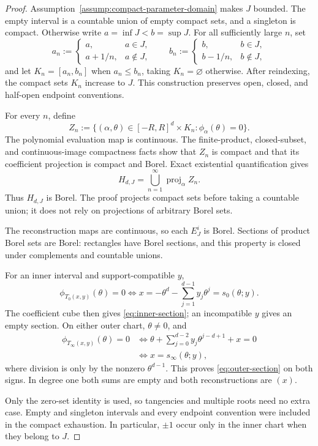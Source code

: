 \begin{proof}
Assumption~\ref{assump:compact-parameter-domain} makes $J$ bounded.  The
empty interval is a countable union of empty compact sets, and a singleton is
compact.  Otherwise write $a=\inf J<b=\sup J$.  For all sufficiently large
$n$, set
\[
a_n:=\begin{cases}a,&a\in J,\\a+1/n,&a\notin J,\end{cases}
\qquad
b_n:=\begin{cases}b,&b\in J,\\b-1/n,&b\notin J,\end{cases}
\]
and let $K_n=[a_n,b_n]$ when $a_n\leq b_n$, taking $K_n=\varnothing$
otherwise.  After reindexing, the compact sets $K_n$ increase to $J$.  This
construction preserves open, closed, and half-open endpoint conventions.

For every $n$, define
\[
Z_n:=\{(\alpha,\theta)\in[-R,R]^d\times K_n:
\phi_\alpha(\theta)=0\}.
\]
The polynomial evaluation map is continuous.  The finite-product,
closed-subset, and continuous-image compactness facts
\citep[Sections~24 and~26]{Munkres2000} show that $Z_n$ is compact and that
its coefficient projection is compact and Borel.  Exact existential
quantification gives
\[
H_{d,J}=\bigcup_{n=1}^\infty\operatorname{proj}_\alpha Z_n.
\]
Thus $H_{d,J}$ is Borel.  The proof projects compact sets before taking a
countable union; it does not rely on projections of arbitrary Borel sets.

The reconstruction maps are continuous, so each $E^i_J$ is Borel.  Sections
of product Borel sets are Borel: rectangles have Borel sections, and this
property is closed under complements and countable unions.

For an inner interval and support-compatible $y$,
\[
\phi_{T_0(x,y)}(\theta)=0
\Longleftrightarrow
x=-\theta^d-\sum_{j=1}^{d-1}y_j\theta^j=s_0(\theta;y).
\]
The coefficient cube then gives \eqref{eq:inner-section}; an incompatible
$y$ gives an empty section.  On either outer chart, $\theta\neq0$, and
\[
\begin{aligned}
\phi_{T_\infty(x,y)}(\theta)=0
&\Longleftrightarrow
\theta+\sum_{j=0}^{d-2}y_j\theta^{j-d+1}+x=0\\
&\Longleftrightarrow x=s_\infty(\theta;y),
\end{aligned}
\]
where division is only by the nonzero $\theta^{d-1}$.  This proves
\eqref{eq:outer-section} on both signs.  In degree one both sums are empty
and both reconstructions are $(x)$.

Only the zero-set identity is used, so tangencies and multiple roots need no
extra case.  Empty and singleton intervals and every endpoint convention
were included in the compact exhaustion.  In particular, $\pm1$ occur only
in the inner chart when they belong to $J$.
\end{proof}

